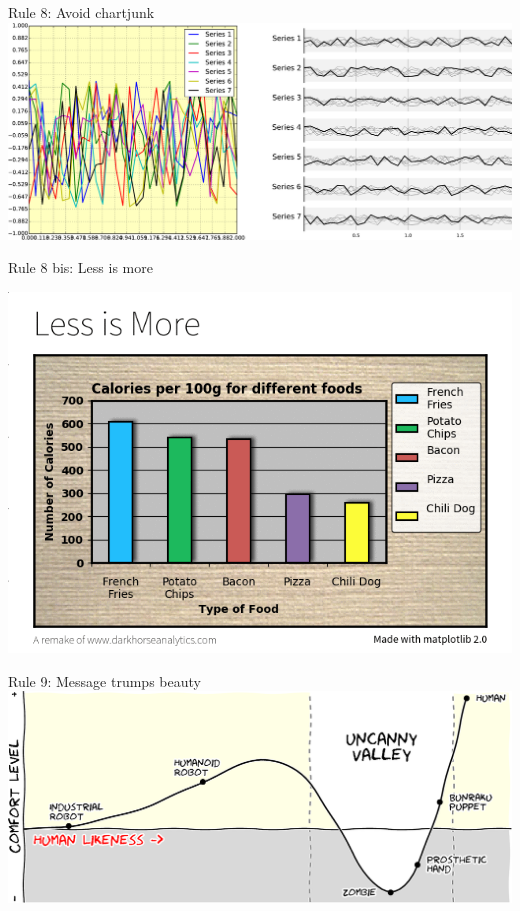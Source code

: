 \documentclass[10pt,aspectratio=169]{beamer}
\begin{document}
\begin{frame}{Rule 8: Avoid chartjunk}
  \includegraphics[width=\textwidth]{rule-8.pdf}
\end{frame}

\begin{frame}{Rule 8 bis: Less is more}
  \begin{center}
    \includegraphics[width=.75\textwidth]{rule-8bis.png}
  \end{center}
\end{frame}

\begin{frame}{Rule 9: Message trumps beauty}
  \includegraphics[width=\textwidth]{rule-9.pdf}
\end{frame}
\end{document}
